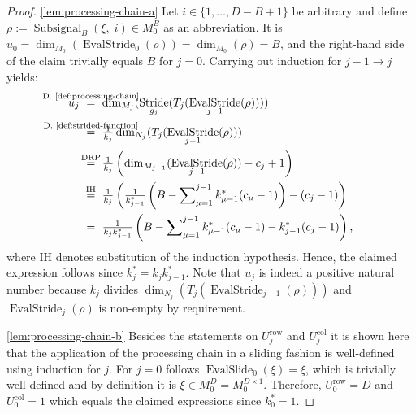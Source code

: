 \documentclass[journal]{IEEEtran}
\newcommand{\ROI}{B}
\newcommand{\discint}[2]{\{#1,\dotsc,#2\}}
\newcommand{\inint}[2]{\in\discint{#1}{#2}}
\DeclareMathOperator{\Subsignal}{Subsignal}
\DeclareMathOperator{\Stride}{Stride}
\DeclareMathOperator{\EvalStride}{EvalStride}
\DeclareMathOperator{\EvalSlide}{EvalSlide}
\newcommand{\row}{\operatorname{row}}
\newcommand{\col}{\operatorname{col}}
\newcommand{\equsing}[1]{\overset{\mathclap{\text{#1}}}{=}}
\begin{document}
\begin{proof}
\ref{lem:processing-chain-a}
Let $i\inint{1}{D - \ROI + 1}$ be arbitrary and define $\rho := \Subsignal_\ROI(\xi,\;i)\in M_0^\ROI$ as an abbreviation.
It is $u_0 = \dim_{M_0}(\EvalStride_0(\rho)) = \dim_{M_0}(\rho) = \ROI$,
and the right-hand side of the claim trivially equals $\ROI$ for $j = 0$.
Carrying out induction for $j - 1 \to j$ yields:
\begin{align*}
  u_j\ &\equsing{D.~\ref{def:processing-chain}}\ \dim_{M_j}(\Stride_{g_j}(T_j(\EvalStride_{j - 1}(\rho))))\\
       &\equsing{D.~\ref{def:strided-function}}\ \tfrac{1}{k_j}\dim_{N_j}(T_j(\EvalStride_{j - 1}(\rho)))\\
       &\equsing{DRP}\ \tfrac{1}{k_j}\left(\dim_{M_{j - 1}}(\EvalStride_{j - 1}(\rho)) - c_j + 1\right)\\
       &\equsing{IH}\ \tfrac{1}{k_j}\left(\tfrac{1}{k_{j - 1}^*}\left(\ROI - \sum\nolimits_{\mu = 1}^{j - 1} k_{\mu - 1}^*(c_\mu - 1)\right) - (c_j - 1)\right)\\
       &=\ \tfrac{1}{k_j k_{j - 1}^*} \left(\ROI - \sum\nolimits_{\mu = 1}^{j - 1} k_{\mu - 1}^*(c_\mu - 1) - k_{j - 1}^*(c_j - 1)\right)\text{,}
\end{align*}
where IH denotes substitution of the induction hypothesis.
Hence, the claimed expression follows since $k_j^* = k_j k_{j - 1}^*$.
Note that $u_j$ is indeed a positive natural number because $k_j$ divides $\dim_{N_j}(T_j(\EvalStride_{j - 1}(\rho)))$ and $\EvalStride_{j}(\rho)$ is non-empty by requirement.

\ref{lem:processing-chain-b}
Besides the statements on $U_j^{\row}$ and $U_j^{\col}$ it is shown here that the application of the processing chain in a sliding fashion is well-defined using induction for $j$.
For $j = 0$ follows $\EvalSlide_0(\xi) = \xi$, which is trivially well-defined and by definition it is $\xi\in M_0^D = M_0^{D\times 1}$.
Therefore, $U_0^{\row} = D$ and $U_0^{\col} = 1$ which equals the claimed expressions since $k_0^* = 1$.


\end{proof}
\end{document}
